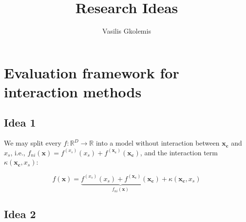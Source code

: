\documentclass[12pt]{article}
\title{Research Ideas}
\author{Vasilis Gkolemis}
\newcommand{\xb}{\mathbf{x}}
\newcommand{\xc}{\mathbf{x_c}}
\newcommand{\fxc}{f^{(\xc)}}
\newcommand{\fxs}{f^{(x_s)}}
\begin{document}
    \maketitle
    \section{Evaluation framework for interaction methods}

    \subsection{Idea 1}

    We may split every $f: \mathbb{R}^D \rightarrow \mathbb{R}$ into
    a model without interaction between $\xc$ and $x_s$,
    i.e., $f_{ni}(\xb) = \fxs(x_s) +  \fxc(\xc)$,
    and the interaction term $\kappa(\xc, x_s)$:

    $$f(\xb) = \underbrace{\fxs(x_s) +  \fxc(\xc)}_{f_{ni}(\xb)} + \kappa(\xc, x_s)$$

    \subsection{Idea 2}
\end{document}
